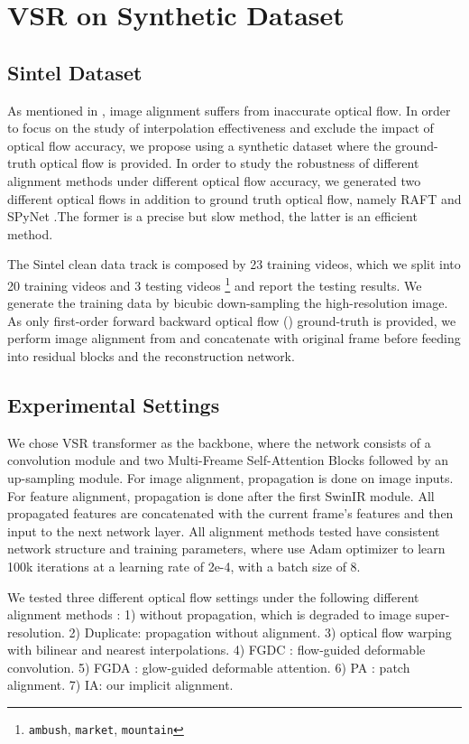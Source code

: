 \documentclass[10pt,twocolumn,letterpaper]{article}
\begin{document}
\section{VSR on Synthetic Dataset}
\subsection{Sintel Dataset} 
As mentioned in \cite{chan2021basicvsr}, image alignment suffers from inaccurate optical flow. In order to focus on the study of interpolation effectiveness and exclude the impact of optical flow accuracy, we propose using a synthetic dataset where the ground-truth optical flow is provided. In order to study the robustness of different alignment methods under different optical flow accuracy, we generated two different optical flows in addition to ground truth optical flow, namely RAFT \cite{teed2020raft} and SPyNet \cite{ranjan2017optical_spynet}.The former is a precise but slow method, the latter is an efficient method.

The Sintel clean data track is composed by 23 training videos, which we split into 20 training videos and 3 testing videos \footnote{\texttt{ambush}, \texttt{market}, \texttt{mountain}} and report the testing results. We generate the training data by bicubic down-sampling the high-resolution image.
As only first-order forward backward optical flow () ground-truth is provided, we perform image alignment from  and concatenate with original frame before feeding into residual blocks and the reconstruction network. 

\subsection{Experimental Settings}
We chose VSR transformer as the backbone, where the network consists of a convolution module and two Multi-Freame Self-Attention Blocks \cite{shi2022rethinking} followed by an up-sampling module. For image alignment, propagation is done on image inputs. For feature alignment, propagation is done after the first SwinIR module.  All propagated features are concatenated with the current frame’s features and then input to the next network layer. All alignment methods tested have consistent network structure and training parameters, where use Adam optimizer to learn 100k iterations at a learning rate of 2e-4, with a batch size of 8.

We tested three different optical flow settings under the following different alignment methods : 1) without propagation, which is degraded to image super-resolution. 2) Duplicate: propagation without alignment. 3) optical flow warping with bilinear and nearest interpolations. 4) FGDC \cite{wang2019edvr}: flow-guided deformable convolution. 5) FGDA \cite{liang2022recurrent_rvrt}: glow-guided deformable attention. 6) PA \cite{shi2022rethinking}: patch alignment. 7) IA: our implicit alignment.
\end{document}
